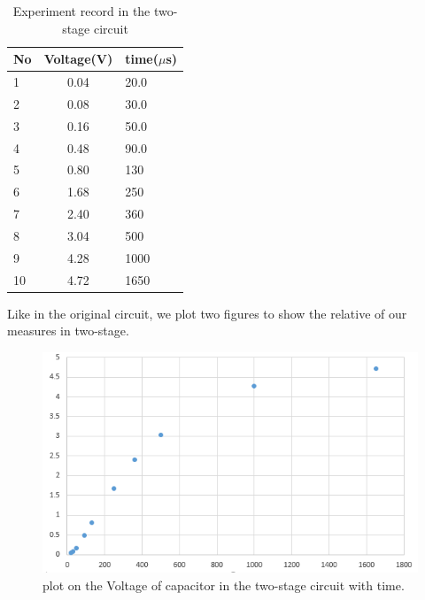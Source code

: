 \begin{table}[htbp]\centering
	\caption{Experiment record in the two-stage circuit}
	\renewcommand\arraystretch{1.5}
	\begin{tabular}{lcl}
		\toprule
		No		&Voltage(V)	&time($\mu$s)	\\
		\midrule
		1		&0.04		&20.0		\\

		2		&0.08		&30.0		\\
		
		3		&0.16		&50.0		\\
		
		4		&0.48		&90.0		\\
		
		5		&0.80		&130		\\
		
		6		&1.68		&250		\\
		
		7		&2.40		&360		\\
		
		8		&3.04		&500		\\
		
		9		&4.28		&1000		\\
		
		10		&4.72		&1650		\\
		\bottomrule
	\end{tabular}
\end{table}
\phantom{ } Like in the original circuit, we plot two figures to show the relative of our measures in two-stage.
\begin{figure}[htbp]
	\centering %
	\includegraphics[width=\linewidth]{images/2_5.PNG} %
	\caption{plot on the Voltage of capacitor in the two-stage circuit with time.} %
	\label{fig:2.5} %
\end{figure}
